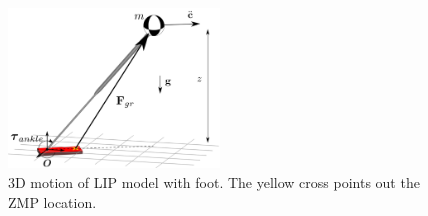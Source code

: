 \begin{figure}[h]
\centering
\includegraphics[width=0.5\textwidth]{STYLESTUFF/3DCoPviz.png}
\caption{\ac{3D} motion of \ac{LIP} model with foot. The yellow cross points out the \ac{ZMP} location.}
\label{fig:3dlipfoot}
\end{figure}

